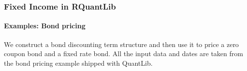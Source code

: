 \documentclass[compress]{beamer}
\begin{document}
\begin{frame}
	\frametitle{Fixed Income in RQuantLib}
	\framesubtitle{Examples: Bond pricing}	
We construct a bond discounting term structure and then use it to price a zero coupon bond and a fixed rate bond. 
\newline
\newline
All the input data and dates are taken from the bond pricing example shipped with QuantLib.
\newline
\vskip5pt
\pagecolor{bgcolor}
\noindent
\scriptsize
\ttfamily
{}\hspace*{\fill}\\
\hlsym{$<${-}\ }\hlstd{}\hspace*{\fill}\\
\hlsym{$<${-}\ }\hlstd{}\hspace*{\fill}\\
\hlsym{$<${-}\ }\hlstd{}\hlstd{}\hlsym{(}\hlstd{}\hlstd{}\hlsym{)}\hspace*{\fill}\\
\hlsym{$<${-}\ }\hlsym{{-}\ }\hspace*{\fill}\\
\mbox{}
\normalfont
\end{frame}
\end{document}
